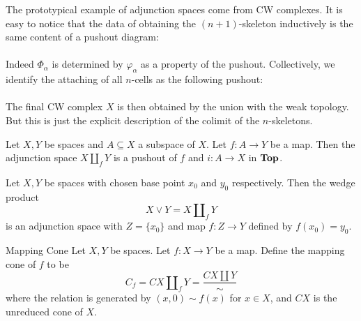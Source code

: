 \documentclass[a4paper]{article}
\begin{document}
The prototypical example of adjunction spaces come from CW complexes. It is easy to notice that the data of obtaining the $(n+1)$-skeleton inductively is the same content of a pushout diagram: \\
\\
Indeed $\Phi_\alpha$ is determined by $\varphi_\alpha$ as a property of the pushout. Collectively, we identify the attaching of all $n$-cells as the following pushout: \\
\\

The final CW complex $X$ is then obtained by the union with the weak topology. But this is just the explicit description of the colimit of the $n$-skeletons. 

\begin{prp}{}{} Let $X,Y$ be spaces and $A\subseteq X$ a subspace of $X$. Let $f:A\to Y$ be a map. Then the adjunction space $X\amalg_f Y$ is a pushout of $f$ and $i:A\to X$ in $\bold{Top}$. 
\end{prp}

\begin{prp}{}{} Let $X,Y$ be spaces with chosen base point $x_0$ and $y_0$ respectively. Then the wedge product $$X\vee Y=X\amalg_fY$$ is an adjunction space with $Z=\{x_0\}$ and map $f:Z\to Y$ defined by $f(x_0)=y_0$. 
\end{prp}

\begin{defn}{Mapping Cone}{} Let $X,Y$ be spaces. Let $f:X\to Y$ be a map. Define the mapping cone of $f$ to be $$C_f=CX\amalg_fY=\frac{CX\amalg Y}{\sim}$$ where the relation is generated by $(x,0)\sim f(x)$ for $x\in X$, and $CX$ is the unreduced cone of $X$. 
\end{defn}
\end{document}
